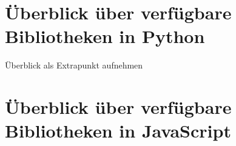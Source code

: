 \section{Überblick über verfügbare Bibliotheken in Python}\label{sec:basics-overview-python}

Überblick als Extrapunkt aufnehmen

\section{Überblick über verfügbare Bibliotheken in JavaScript}\label{sec:basics-overview-js}

